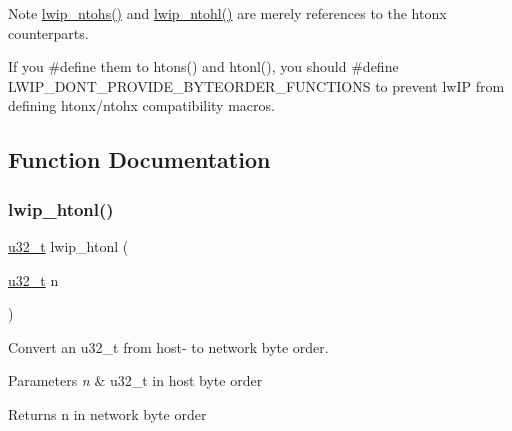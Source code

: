 Note \hyperlink{native_2lwip_2src_2include_2lwip_2def_8h_ac642bf6057869696d7807564d8309ffc}{lwip\+\_\+ntohs()} and \hyperlink{native_2lwip_2src_2include_2lwip_2def_8h_a56098407d66feb75806f655bafbee81d}{lwip\+\_\+ntohl()} are merely references to the htonx counterparts.

If you \#define them to htons() and htonl(), you should \#define L\+W\+I\+P\+\_\+\+D\+O\+N\+T\+\_\+\+P\+R\+O\+V\+I\+D\+E\+\_\+\+B\+Y\+T\+E\+O\+R\+D\+E\+R\+\_\+\+F\+U\+N\+C\+T\+I\+O\+NS to prevent lw\+IP from defining htonx/ntohx compatibility macros. 

\subsection{Function Documentation}
\mbox{\label{openmote-cc2538_2lwip_2src_2core_2def_8c_a14f94347a5b9b9e3602705b75b7ae524}} 
\subsubsection{\texorpdfstring{lwip\+\_\+htonl()}{lwip\_htonl()}}
{\footnotesize\ttfamily \hyperlink{group__compiler__abstraction_ga4c14294869aceba3ef9d4c0c302d0f33}{u32\+\_\+t} lwip\+\_\+htonl (\begin{DoxyParamCaption}\item[{\hyperlink{group__compiler__abstraction_ga4c14294869aceba3ef9d4c0c302d0f33}{u32\+\_\+t}}]{n }\end{DoxyParamCaption})}

Convert an u32\+\_\+t from host-\/ to network byte order.


\begin{DoxyParams}{Parameters}
{\em n} & u32\+\_\+t in host byte order \\
\hline
\end{DoxyParams}
\begin{DoxyReturn}{Returns}
n in network byte order 
\end{DoxyReturn}
\mbox{\label{openmote-cc2538_2lwip_2src_2core_2def_8c_ad637280639de4066392e6b5614fa3e56}} 
